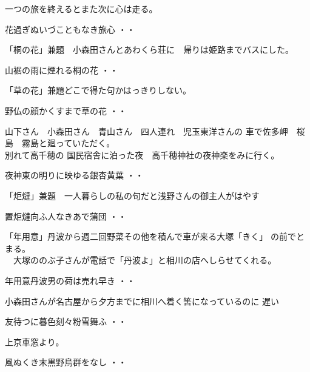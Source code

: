 \vspace{0.6cm}
一つの旅を終えるとまた次に心は走る。
\begin{shiika}花過ぎぬいづこともなき旅心
\hfill{・・}\end{shiika}
\vspace{0.6cm}
「桐の花」兼題　小森田さんとあわくら荘に　帰りは姫路までバスにした。
\begin{shiika}山裾の雨に煙れる桐の花
\hfill{・・}\end{shiika}
\newpage

\newpage
\vspace{0.6cm}
「草の花」兼題どこで得た句かはっきりしない。
\begin{shiika}野仏の顔かくすまで草の花
\hfill{・・}\end{shiika}
\vspace{0.6cm}
山下さん　小森田さん　青山さん　四人連れ　児玉東洋さんの
車で佐多岬　桜島　霧島と廻っていただく。\\別れて高千穂の
国民宿舎に泊った夜　高千穂神社の夜神楽をみに行く。
\begin{shiika}夜神東の明りに映ゆる銀杏黄葉
\hfill{・・}\end{shiika}
\vspace{0.6cm}
「炬燵」兼題　一人暮らしの私の句だと浅野さんの御主人がはやす
\begin{shiika}置炬燵向ふ人なきあで蒲団
\hfill{・・}\end{shiika}
\vspace{0.6cm}
「年用意」丹波から週二回野菜その他を積んで車が来る大塚「きく」
の前でとまる。\\　大塚ののぶ子さんが電話で「丹波よ」と相川の店へしらせてくれる。
\begin{shiika}年用意丹波男の荷は売れ早き
\hfill{・・}\end{shiika}
\vspace{0.6cm}
\vspace{0.6cm}
小森田さんが名古屋から夕方までに相川へ着く筈になっているのに
遅い
\begin{shiika}友待つに暮色刻々粉雪舞ふ
\hfill{・・}\end{shiika}
\vspace{0.6cm}
上京車窓より。
\begin{shiika}風ぬくき末黒野烏群をなし
\hfill{・・}\end{shiika}
